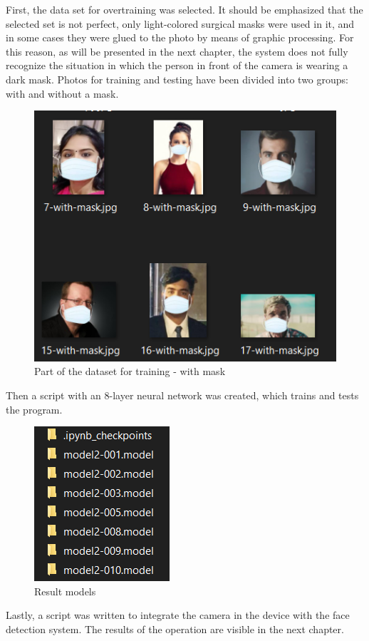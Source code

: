 \documentclass[12pt,a4paper]{article}
\begin{document}
First, the data set for overtraining was selected. It should be emphasized that the selected set is not perfect, only light-colored surgical masks were used in it, and in some cases they were glued to the photo by means of graphic processing. For this reason, as will be presented in the next chapter, the system does not fully recognize the situation in which the person in front of the camera is wearing a dark mask. Photos for training and testing have been divided into two groups: with and without a mask. 
\begin{figure}[h!]
    \centering
    \includegraphics[scale = 1]{media/mask.png}
    \caption{Part of the dataset for training - with mask }
    \label{fig:Rysunek1}
\end{figure}
\newpage
Then a script with an 8-layer neural network was created, which trains and tests the program.
\begin{figure}[h!]
    \centering
    \includegraphics[scale = 1]{media/modele.png}
    \caption{Result models}
    \label{fig:Rysunek1}
\end{figure}
Lastly, a script was written to integrate the camera in the device with the face detection system. The results of the operation are visible in the next chapter.
\end{document}

